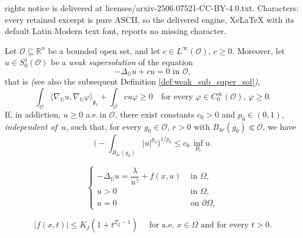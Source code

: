 \documentclass[10pt,a4paper]{amsart}
\def\R{\mathbb{R}}
\begin{document}
rights notice is delivered at licenses/arxiv-2506.07521-CC-BY-4.0.txt. Characters: every retained excerpt is pure ASCII, so the delivered engine, XeLaTeX with its default Latin Modern text font, reports no missing character.
\begin{prop} \label{prop:WHarnack}
 Let $\mathcal{O}\subseteq\R^n$ be a bounded open set, and let 
 $c\in L^\infty(\mathcal{O}),\,c\geq 0.$
 Moreover, let $u\in S_0^1(\mathcal{O})$ be a \emph{weak supersolution}
 of the equation 
 \begin{equation} \label{eq:PDEOrderzeroHarnack}
  \text{$-\Delta_\mathbb{G}u+cu = 0$ in $\mathcal{O}$},
  \end{equation}
 that is
 \emph{(}see also the subsequent Definition \ref{def:weak_sub_super_sol}\emph{)},
 $$\int_\mathcal{O}\langle\nabla_\mathbb{G}u,\nabla_\mathbb{G}\varphi\rangle_{\mathfrak{g}_{1}}
 +\int_\mathcal{O} cu\varphi\geq 0\quad\text{
 for every $\varphi\in C_0^\infty(\mathcal{O}),\,\varphi\geq 0$}.$$
 If, in addiction, $u\geq 0$ a.e.\,in $\mathcal{O}$, there exist
 constants $c_0 > 0$ and $p_0\in (0,1)$,
 \emph{independent of~$u$}, such that,
 for every $g_0\in\mathcal{O},\,r > 0$ with $B_{4r}(g_0)\Subset\mathcal{O}$, we have
 \begin{equation} \label{eq:HarnackInequ}
  \Big(-\!\!\!\!\!\!\!\int_{B_{3r}(g_0)}|u|^{p_0}\Big)^{1/p_0}\leq c_0\,\inf_{B_{r}}u.
 \end{equation}
\end{prop}

\begin{equation}\label{eq:General_Singular_Problem}
	\left\{\begin{array}{rl}
		-\Delta_{\mathbb{G}}u = \dfrac{\lambda}{u^{\gamma}} + f(x,u)& \textrm{ in } \Omega,\\
		u>0 & \textrm{ in } \Omega,\\
		u=0 & \textrm{ on } \partial \Omega,
	\end{array}\right.
\end{equation}

\begin{equation}\label{eq:Growth_of_f}
	|f(x,t)|\leq K_{f} (1+t^{2^{\star}_{Q}-1})  \quad \textrm{ for a.e. } x \in \Omega \textrm{ and for  every } t>0.
\end{equation}
\end{document}
